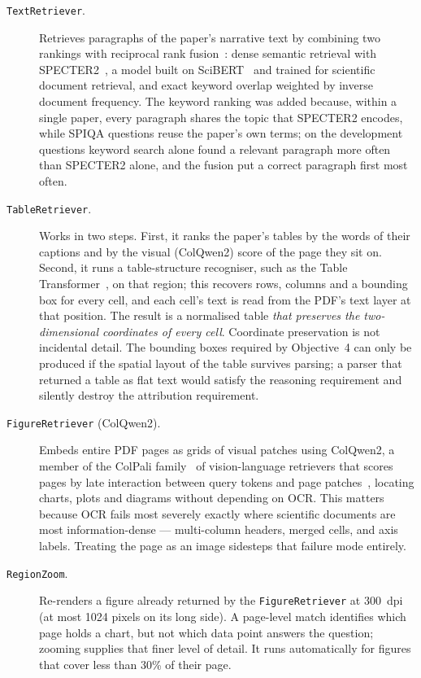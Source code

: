 \begin{description}
    \item[\texttt{TextRetriever}.] Retrieves paragraphs of the paper's narrative text
    by combining two rankings with reciprocal rank fusion~\cite{cormack2009rrf}: dense
    semantic retrieval with SPECTER2~\cite{singh2023scirepeval}, a model built on
    SciBERT~\cite{beltagy2019scibert} and trained for scientific document retrieval,
    and exact keyword overlap weighted by inverse document frequency. The keyword
    ranking was added because, within a single paper, every paragraph shares the
    topic that SPECTER2 encodes, while SPIQA questions reuse the paper's own terms;
    on the development questions keyword search alone found a relevant paragraph more
    often than SPECTER2 alone, and the fusion put a correct paragraph first most often.

    \item[\texttt{TableRetriever}.] Works in two steps. First, it ranks the paper's
    tables by the words of their captions and by the visual (ColQwen2) score of the
    page they sit on. Second, it runs a table-structure recogniser,
    such as the Table Transformer~\cite{smock2022pubtables}, on that region; this
    recovers rows, columns and a bounding box for every cell, and each cell's text
    is read from the PDF's text layer at that position. The result is a normalised
    table \emph{that preserves the two-dimensional coordinates of every cell}. Coordinate preservation is not incidental detail. The bounding boxes
    required by Objective~4 can only be produced if the spatial layout of the table
    survives parsing; a parser that returned a table as flat text would satisfy the
    reasoning requirement and silently destroy the attribution requirement.

    \item[\texttt{FigureRetriever} (ColQwen2).] Embeds entire PDF pages as grids of
    visual patches using ColQwen2, a member of the ColPali family~\cite{faysse2025colpali}
    of vision-language retrievers
    that scores pages by late interaction between query tokens and page
    patches~\cite{khattab2020colbert}, locating charts,
    plots and diagrams without depending on OCR. This matters because OCR fails
    most severely exactly where scientific documents are most information-dense ---
    multi-column headers, merged cells, and axis labels. Treating the page as an
    image sidesteps that failure mode entirely.

    \item[\texttt{RegionZoom}.] Re-renders a figure already returned by the
    \texttt{FigureRetriever} at 300~dpi (at most 1024 pixels on its long side). A
    page-level match identifies which page holds a chart, but not which data point
    answers the question; zooming supplies that finer level of detail. It runs
    automatically for figures that cover less than 30\% of their page.
\end{description}

